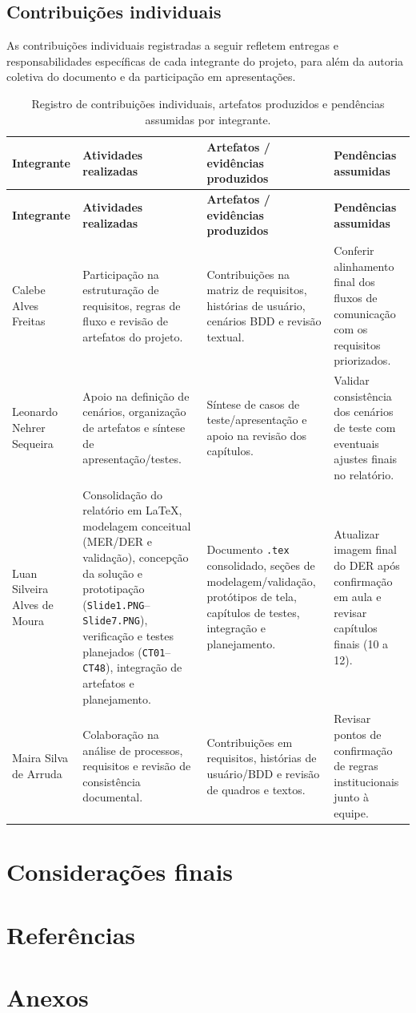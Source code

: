 \documentclass[a4paper,12pt]{report}
\begin{document}
\section{Contribuições individuais}

As contribuições individuais registradas a seguir refletem entregas e responsabilidades específicas de cada integrante do projeto, para além da autoria coletiva do documento e da participação em apresentações.

\begin{longtable}{|p{3.2cm}|p{4.0cm}|p{4.0cm}|p{3.4cm}|}
\caption{Registro de contribuições individuais, artefatos produzidos e pendências assumidas por integrante.} \label{tab:contribuicoes-individuais} \\
\hline
\textbf{Integrante} & \textbf{Atividades realizadas} & \textbf{Artefatos / evidências produzidos} & \textbf{Pendências assumidas} \\
\hline
\endfirsthead
\hline
\textbf{Integrante} & \textbf{Atividades realizadas} & \textbf{Artefatos / evidências produzidos} & \textbf{Pendências assumidas} \\
\hline
\endhead
Calebe Alves Freitas & Participação na estruturação de requisitos, regras de fluxo e revisão de artefatos do projeto. & Contribuições na matriz de requisitos, histórias de usuário, cenários BDD e revisão textual. & Conferir alinhamento final dos fluxos de comunicação com os requisitos priorizados. \\
\hline
Leonardo Nehrer Sequeira & Apoio na definição de cenários, organização de artefatos e síntese de apresentação/testes. & Síntese de casos de teste/apresentação e apoio na revisão dos capítulos. & Validar consistência dos cenários de teste com eventuais ajustes finais no relatório. \\
\hline
Luan Silveira Alves de Moura & Consolidação do relatório em \LaTeX, modelagem conceitual (MER/DER e validação), concepção da solução e prototipação (\texttt{Slide1.PNG}--\texttt{Slide7.PNG}), verificação e testes planejados (\texttt{CT01}--\texttt{CT48}), integração de artefatos e planejamento. & Documento \texttt{.tex} consolidado, seções de modelagem/validação, protótipos de tela, capítulos de testes, integração e planejamento. & Atualizar imagem final do DER após confirmação em aula e revisar capítulos finais (10 a 12). \\
\hline
Maira Silva de Arruda & Colaboração na análise de processos, requisitos e revisão de consistência documental. & Contribuições em requisitos, histórias de usuário/BDD e revisão de quadros e textos. & Revisar pontos de confirmação de regras institucionais junto à equipe. \\
\hline
\end{longtable}

\chapter{Considerações finais}

\chapter{Referências}

\chapter{Anexos}
\end{document}
